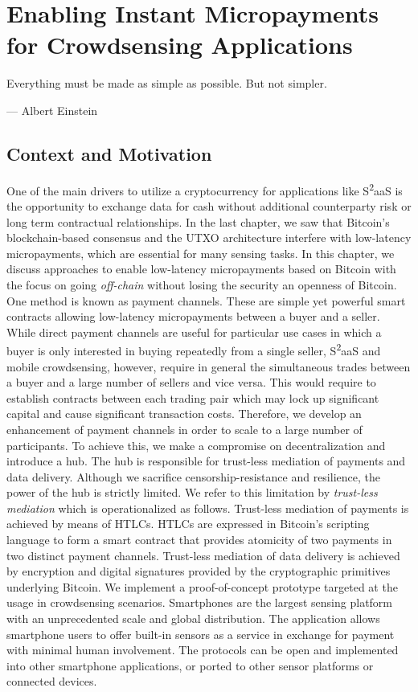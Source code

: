 \chapter{Enabling Instant Micropayments for Crowdsensing Applications}
\label{sec:goingoffchain}

\epigraph{Everything must be made as simple as possible. But not simpler.}{--- \textup{Albert Einstein}}


\section{Context and Motivation}

One of the main drivers to utilize a cryptocurrency for applications like S\textsuperscript{2}aaS is the opportunity to exchange data for cash without additional counterparty risk or long term contractual relationships. In the last chapter, we saw that Bitcoin's blockchain-based consensus and the \ac{UTXO} architecture interfere with low-latency micropayments, which are essential for many sensing tasks. In this chapter, we discuss approaches to enable low-latency micropayments based on Bitcoin with the focus on going \emph{off-chain} without losing the security an openness of Bitcoin.
One method is known as payment channels. These are simple yet powerful smart contracts allowing low-latency micropayments between a buyer and a seller. While direct payment channels are useful for particular use cases in which a buyer is only interested in buying repeatedly from a single seller, S\textsuperscript{2}aaS and mobile crowdsensing, however, require in general the simultaneous trades between a buyer and a large number of sellers and vice versa. This would require to establish contracts between each trading pair which may lock up significant capital and cause significant transaction costs. Therefore, we develop an enhancement of payment channels in order to scale to a large number of participants. To achieve this, we make a compromise on decentralization and introduce a hub. The hub is responsible for trust-less mediation of payments and data delivery. Although we sacrifice censorship-resistance and resilience, the power of the hub is strictly limited. We refer to this limitation by \emph{trust-less mediation} which is operationalized as follows. Trust-less mediation of payments is achieved by means of \ac{HTLC}s. \ac{HTLC}s are expressed in Bitcoin's scripting language to form a smart contract that provides atomicity of two payments in two distinct payment channels. Trust-less mediation of data delivery is achieved by encryption and digital signatures provided by the cryptographic primitives underlying Bitcoin. 
We implement a proof-of-concept prototype targeted at the usage in crowdsensing scenarios. Smartphones are the largest sensing platform with an unprecedented scale and global distribution. The application allows smartphone users to offer built-in sensors as a service in exchange for payment with minimal human involvement. The protocols can be open and implemented into other smartphone applications, or ported to other sensor platforms or connected devices.

